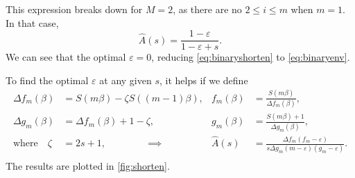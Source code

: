 \documentclass[12pt]{article}
\begin{document}
This expression breaks down for \(M = 2\), as there are no \( 2 \leq i \leq m \) when \(m = 1\).
In that case, 
%
\begin{equation}\label{eq:binaryshorten}
  \hat{A}(s) = \frac{1-\varepsilon}{1-\varepsilon + s}.
\end{equation}
%
We can see that the optimal \(\varepsilon = 0\), reducing \cref{eq:binaryshorten} to \cref{eq:binaryenv}.

To find the optimal \(\varepsilon\) at any given \(s\), it helps if we define
%
\begin{equation*}
\begin{aligned}
  \Delta f_m(\beta) &= S(m\beta) - \zeta S((m-1)\beta), &
  f_m(\beta) &= \frac{S(m\beta)}{\Delta f_m(\beta)}, \\
  \Delta g_m(\beta) &= \Delta f_m(\beta) + 1 - \zeta , &
  g_m(\beta) &= \frac{S(m\beta) + 1}{\Delta g_m(\beta)}, \\
  \text{where}\quad \zeta &= 2s + 1, 
  \qquad\qquad \implies & 
  \hat{A}(s) &= \frac{\Delta f_{m} (f_m - \varepsilon)}
           {s \Delta g_{m} (m - \varepsilon) (g_m - \varepsilon)}.
  \\
\end{aligned}
\end{equation*}
%
The results are plotted in \cref{fig:shorten}.
\end{document}
